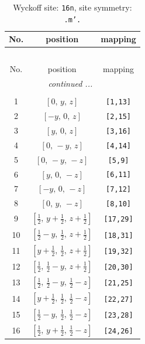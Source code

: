 \documentclass[fleqn,8pt]{jsarticle}
\begin{document}
\renewcommand{\arraystretch}{1.2}
\begin{longtable}{ccc}
\caption{Wyckoff site: {\tt 16n}, site symmetry: {\tt .m'.}}
 \\
 \hline \hline
No. & position & mapping \\ \hline \endfirsthead

\multicolumn{2}{l}{\tablename\ \thetable{}} \\
 \hline \hline
No. & position & mapping \\ \hline \endhead

 \hline \hline
\multicolumn{2}{r}{\footnotesize\it continued ...} \\ \endfoot

 \hline \hline
\multicolumn{2}{r}{} \\ \endlastfoot

1 & $\left[ 0,\, y,\, z \right]$ & {\tt [1,13]} \\ \hline
2 & $\left[ - y,\, 0,\, z \right]$ & {\tt [2,15]} \\ \hline
3 & $\left[ y,\, 0,\, z \right]$ & {\tt [3,16]} \\ \hline
4 & $\left[ 0,\, - y,\, z \right]$ & {\tt [4,14]} \\ \hline
5 & $\left[ 0,\, - y,\, - z \right]$ & {\tt [5,9]} \\ \hline
6 & $\left[ y,\, 0,\, - z \right]$ & {\tt [6,11]} \\ \hline
7 & $\left[ - y,\, 0,\, - z \right]$ & {\tt [7,12]} \\ \hline
8 & $\left[ 0,\, y,\, - z \right]$ & {\tt [8,10]} \\ \hline
9 & $\left[ \frac{1}{2},\, y + \frac{1}{2},\, z + \frac{1}{2} \right]$ & {\tt [17,29]} \\ \hline
10 & $\left[ \frac{1}{2} - y,\, \frac{1}{2},\, z + \frac{1}{2} \right]$ & {\tt [18,31]} \\ \hline
11 & $\left[ y + \frac{1}{2},\, \frac{1}{2},\, z + \frac{1}{2} \right]$ & {\tt [19,32]} \\ \hline
12 & $\left[ \frac{1}{2},\, \frac{1}{2} - y,\, z + \frac{1}{2} \right]$ & {\tt [20,30]} \\ \hline
13 & $\left[ \frac{1}{2},\, \frac{1}{2} - y,\, \frac{1}{2} - z \right]$ & {\tt [21,25]} \\ \hline
14 & $\left[ y + \frac{1}{2},\, \frac{1}{2},\, \frac{1}{2} - z \right]$ & {\tt [22,27]} \\ \hline
15 & $\left[ \frac{1}{2} - y,\, \frac{1}{2},\, \frac{1}{2} - z \right]$ & {\tt [23,28]} \\ \hline
16 & $\left[ \frac{1}{2},\, y + \frac{1}{2},\, \frac{1}{2} - z \right]$ & {\tt [24,26]} \\
\end{longtable}
\end{document}
